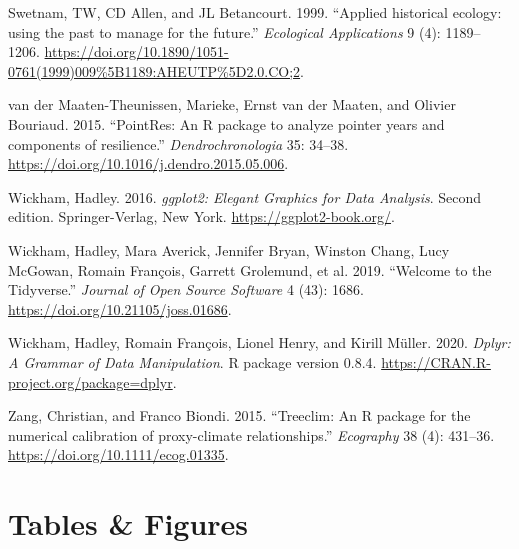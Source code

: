 \documentclass[review]{elsarticle} %
\begin{document}
\leavevmode\hypertarget{ref-Swetnam1999}{}%
Swetnam, TW, CD Allen, and JL Betancourt. 1999. ``Applied historical ecology: using the past to manage for the future.'' \emph{Ecological Applications} 9 (4): 1189--1206. \url{https://doi.org/10.1890/1051-0761(1999)009\%5B1189:AHEUTP\%5D2.0.CO;2}.

\leavevmode\hypertarget{ref-VanderMaaten-Theunissen2015}{}%
van der Maaten-Theunissen, Marieke, Ernst van der Maaten, and Olivier Bouriaud. 2015. ``PointRes: An R package to analyze pointer years and components of resilience.'' \emph{Dendrochronologia} 35: 34--38. \url{https://doi.org/10.1016/j.dendro.2015.05.006}.

\leavevmode\hypertarget{ref-wickham2016ggplot2}{}%
Wickham, Hadley. 2016. \emph{ggplot2: Elegant Graphics for Data Analysis}. Second edition. Springer-Verlag, New York. \url{https://ggplot2-book.org/}.

\leavevmode\hypertarget{ref-Wickham2019}{}%
Wickham, Hadley, Mara Averick, Jennifer Bryan, Winston Chang, Lucy McGowan, Romain François, Garrett Grolemund, et al. 2019. ``Welcome to the Tidyverse.'' \emph{Journal of Open Source Software} 4 (43): 1686. \url{https://doi.org/10.21105/joss.01686}.

\leavevmode\hypertarget{ref-Wickham2020dplyr}{}%
Wickham, Hadley, Romain François, Lionel Henry, and Kirill Müller. 2020. \emph{Dplyr: A Grammar of Data Manipulation}. R package version 0.8.4. \url{https://CRAN.R-project.org/package=dplyr}.

\leavevmode\hypertarget{ref-Zang2015}{}%
Zang, Christian, and Franco Biondi. 2015. ``Treeclim: An R package for the numerical calibration of proxy-climate relationships.'' \emph{Ecography} 38 (4): 431--36. \url{https://doi.org/10.1111/ecog.01335}.

\newpage

\hypertarget{tables-figures}{%
\section*{Tables \& Figures}\label{tables-figures}}
\end{document}
